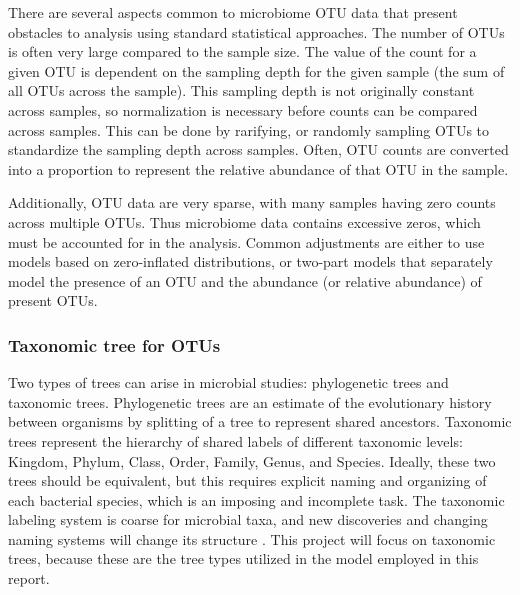 \documentclass[12pt]{article}
\begin{document}
There are several aspects common to microbiome OTU data that present obstacles to analysis using standard statistical approaches. The number of OTUs is often very large compared to the sample size. The value of the count for a given OTU is dependent on the sampling depth for the given sample (the sum of all OTUs across the sample). This sampling depth is not originally constant across samples, so  normalization is necessary before counts can be compared across samples. This can be done by rarifying, or randomly sampling OTUs to standardize the sampling depth across samples. Often, OTU counts are converted into a proportion to represent the relative abundance of that OTU in the sample.


Additionally, OTU data are very sparse, with many samples having zero counts across multiple OTUs. Thus microbiome data contains excessive zeros, which must be accounted for in the analysis. Common adjustments are either to use models based on zero-inflated distributions, or two-part models that separately model the presence of an OTU and the abundance (or relative abundance) of present OTUs.





%


\subsubsection{Taxonomic tree for OTUs}

Two types of trees can arise in microbial studies: phylogenetic trees and taxonomic trees. Phylogenetic trees  are an estimate of the evolutionary history between organisms by splitting of a tree to represent shared ancestors. Taxonomic trees represent the hierarchy of shared labels of different taxonomic levels: Kingdom, Phylum, Class, Order, Family, Genus, and Species. Ideally, these two trees should be equivalent, but this requires explicit naming and organizing of each bacterial species, which is an imposing and incomplete task. The taxonomic labeling system is coarse for microbial taxa, and new discoveries and changing naming systems will change its structure \cite{washburne2018methods}. This project will focus on taxonomic trees, because these are the tree types utilized in the model employed in this report.
\end{document}
